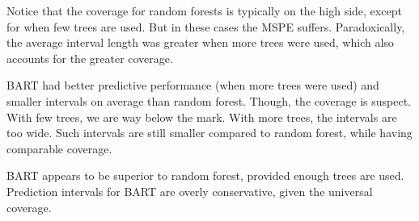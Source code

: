 \documentclass[12pt]{article}
\begin{document}
Notice that the coverage for random forests is typically on the high side, except for when few trees are used. But in these cases the MSPE suffers. Paradoxically, the average interval length was greater when more trees were used, which also accounts for the greater coverage.
\bigskip

BART had better predictive performance (when more trees were used) and smaller intervals on average than random forest. Though, the coverage is suspect. With few trees, we are way below the mark. With more trees, the intervals are too wide. Such intervals are still smaller compared to random forest, while having comparable coverage.
\bigskip

BART appears to be superior to random forest, provided enough trees are used. Prediction intervals for BART are overly conservative, given the universal coverage.
\end{document}
